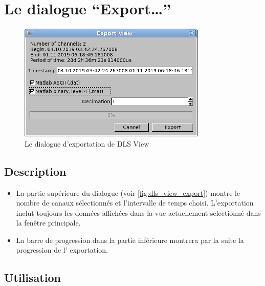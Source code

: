 \documentclass[a4paper,12pt,BCOR6mm,bibtotoc,idxtotoc]{scrbook}
\begin{document}

\section{Le dialogue ``Export\ldots''}
\label{sec:view_export}

\begin{figure}[tbh]
  \begin{center}
    \includegraphics[width=.6\textwidth]{bilder/view_export_en}
  \end{center}
  \caption{Le dialogue d'exportation de DLS View}
  \label{fig:dls_view_export}
\end{figure}


\subsection{Description}

\begin{itemize}

\item La partie sup\'erieure du dialogue (voir
  \autoref{fig:dls_view_export}) montre le nombre de canaux
  s\'electionn\'es et l'intervalle de temps choisi.
  L'exportation inclut toujours les donn\'ees
  affich\'ees dans la vue actuellement selectionn\'e dans la fen\^etre
  principale.

\item La barre de progression dans la partie inf\'erieure montrera par
  la suite la progression de l' exportation.

\end{itemize}


\subsection{Utilisation}
\end{document}
